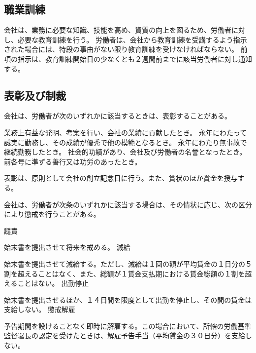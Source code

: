 \documentclass[10pt,a4paper,uplatex]{jsarticle}
\begin{document}
\subsection{職業訓練}

会社は、業務に必要な知識、技能を高め、資質の向上を図るため、労働者に対し、必要な教育訓練を行う。
\term
労働者は、会社から教育訓練を受講するよう指示された場合には、特段の事由がない限り教育訓練を受けなければならない。
\term
前項の指示は、教育訓練開始日の少なくとも２週間前までに該当労働者に対し通知する。

\subsection{表彰及び制裁}

会社は、労働者が次のいずれかに該当するときは、表彰することがある。
\begin{enumerate}
    \itm 業務上有益な発明、考案を行い、会社の業績に貢献したとき。
    \itm 永年にわたって誠実に勤務し、その成績が優秀で他の模範となるとき。
    \itm 永年にわたり無事故で継続勤務したとき。
    \itm 社会的功績があり、会社及び労働者の名誉となったとき。
    \itm 前各号に準ずる善行又は功労のあったとき。
\end{enumerate}
\term
表彰は、原則として会社の創立記念日に行う。また、賞状のほか賞金を授与する。

会社は、労働者が次条のいずれかに該当する場合は、その情状に応じ、次の区分により懲戒を行うことがある。
\begin{enumerate}
    \itm 譴責\par 始末書を提出させて将来を戒める。
    \itm 減給\par 始末書を提出させて減給する。ただし、減給は１回の額が平均賃金の１日分の５割を超えることはなく、また、総額が１賃金支払期における賃金総額の１割を超えることはない。
    \itm 出勤停止\par 始末書を提出させるほか、１４日間を限度として出勤を停止し、その間の賃金は支給しない。
    \itm 懲戒解雇\par 予告期間を設けることなく即時に解雇する。この場合において、所轄の労働基準監督署長の認定を受けたときは、解雇予告手当（平均賃金の３０日分）を支給しない。
\end{enumerate}
\end{document}
